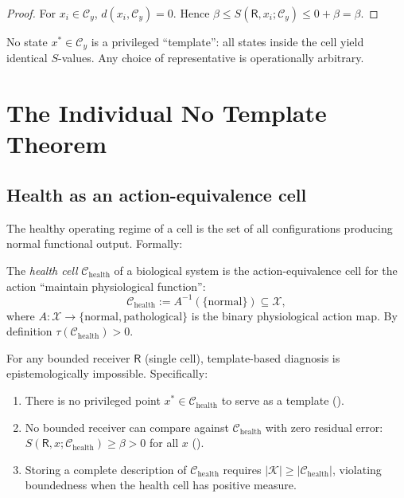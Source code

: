 \documentclass[twocolumn,11pt,a4paper]{article}
\newcommand{\receiver}{\mathsf{R}}
\newcommand{\Cell}{\mathcal{C}}
\newcommand{\X}{\mathcal{X}}
\newcommand{\K}{\mathcal{K}}
\begin{document}
\begin{proof}
For $x_i \in \Cell_y$, $d(x_i, \Cell_y) = 0$. Hence
$\beta \leq S(\receiver, x_i; \Cell_y) \leq 0 + \beta = \beta$.
\end{proof}

\begin{corollary}\label{cor:no-rep}
No state $x^* \in \Cell_y$ is a privileged ``template'': all states inside
the cell yield identical $S$-values. Any choice of representative is
operationally arbitrary.
\end{corollary}

\section{The Individual No Template Theorem}
\label{sec:individual}

\subsection{Health as an action-equivalence cell}

The healthy operating regime of a cell is the set of all configurations
producing normal functional output. Formally:

\begin{definition}\label{def:health-cell}
The \emph{health cell} $\Cell_{\mathrm{health}}$ of a biological system is
the action-equivalence cell for the action ``maintain physiological function'':
\[
\Cell_{\mathrm{health}} := A^{-1}(\{\text{normal}\}) \subseteq \X,
\]
where $A:\X\to\{\text{normal},\text{pathological}\}$ is the binary
physiological action map. By definition $\tau(\Cell_{\mathrm{health}}) > 0$.
\end{definition}

\begin{theorem}\label{thm:no-template}
For any bounded receiver $\receiver$ (single cell), template-based
diagnosis is epistemologically impossible. Specifically:
\begin{enumerate}[label=(\roman*),leftmargin=*,nosep]
\item There is no privileged point $x^* \in \Cell_{\mathrm{health}}$
      to serve as a template ().
\item No bounded receiver can compare against $\Cell_{\mathrm{health}}$
      with zero residual error: $S(\receiver, x; \Cell_{\mathrm{health}})
      \geq \beta > 0$ for all $x$ ().
\item Storing a complete description of $\Cell_{\mathrm{health}}$ requires
      $|\K| \geq |\Cell_{\mathrm{health}}|$, violating boundedness when
      the health cell has positive measure.
\end{enumerate}
\end{theorem}
\end{document}
